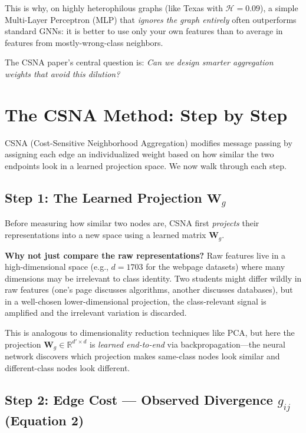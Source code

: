 \documentclass[11pt,a4paper]{article}
\newcommand{\R}{\mathbb{R}}
\newcommand{\bW}{\mathbf{W}}
\theoremstyle{definition}
\theoremstyle{plain}
\begin{document}
This is why, on highly heterophilous graphs (like Texas with $\mathcal{H} = 0.09$),
a simple Multi-Layer Perceptron (MLP) that \emph{ignores the graph entirely}
often outperforms standard GNNs: it is better to use only your own features
than to average in features from mostly-wrong-class neighbors.

The CSNA paper's central question is:
\emph{Can we design smarter aggregation weights that avoid this dilution?}


\section{The CSNA Method: Step by Step}
\label{sec:method}

CSNA (Cost-Sensitive Neighborhood Aggregation) modifies message passing by
assigning each edge an individualized weight based on how similar the two
endpoints look in a learned projection space.
We now walk through each step.


\subsection{Step 1: The Learned Projection $\bW_g$}
\label{sec:projection}

Before measuring how similar two nodes are, CSNA first \emph{projects} their
representations into a new space using a learned matrix $\bW_g$.

\textbf{Why not just compare the raw representations?}
Raw features live in a high-dimensional space (e.g., $d = 1703$ for the webpage
datasets) where many dimensions may be irrelevant to class identity.
Two students might differ wildly in raw features (one's page discusses algorithms,
another discusses databases), but in a well-chosen lower-dimensional projection,
the class-relevant signal is amplified and the irrelevant variation is discarded.

This is analogous to dimensionality reduction techniques like PCA, but here the
projection $\bW_g \in \R^{d' \times d}$ is \emph{learned end-to-end} via
backpropagation---the neural network discovers which projection makes same-class
nodes look similar and different-class nodes look different.


\subsection{Step 2: Edge Cost --- Observed Divergence $g_{ij}$ (Equation 2)}
\label{sec:gij}
\end{document}

